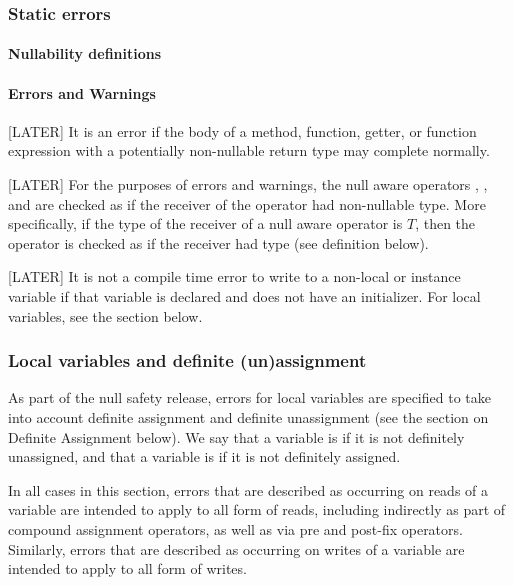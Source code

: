 \documentclass[makeidx]{article}
\begin{document}
\subsubsection{Static errors}

\paragraph{Nullability definitions}

\paragraph{Errors and Warnings}

[LATER] It is an error if the body of a method, function, getter, or
function expression with a potentially non-nullable return type may
complete normally.

[LATER] For the purposes of errors and warnings, the null aware
operators , , and  are checked as if the
receiver of the operator had non-nullable type.  More specifically, if
the type of the receiver of a null aware operator is $T$, then the
operator is checked as if the receiver had type 
(see definition below).

[LATER] It is not a compile time error to write to a \FINAL{}
non-local or instance variable if that variable is declared \LATE{}
and does not have an initializer.  For local variables, see the
section below.

\subsubsection{Local variables and definite (un)assignment}

As part of the null safety release, errors for local variables are specified to
take into account definite assignment and definite unassignment (see the
section on Definite Assignment below).  We say that a variable is
if it is not definitely unassigned, and that a variable is
 if it is not definitely assigned.

In all cases in this section, errors that are described as occurring on reads of
a variable are intended to apply to all form of reads, including indirectly as
part of compound assignment operators, as well as via pre and post-fix
operators.  Similarly, errors that are described as occurring on writes of a
variable are intended to apply to all form of writes.
\end{document}
